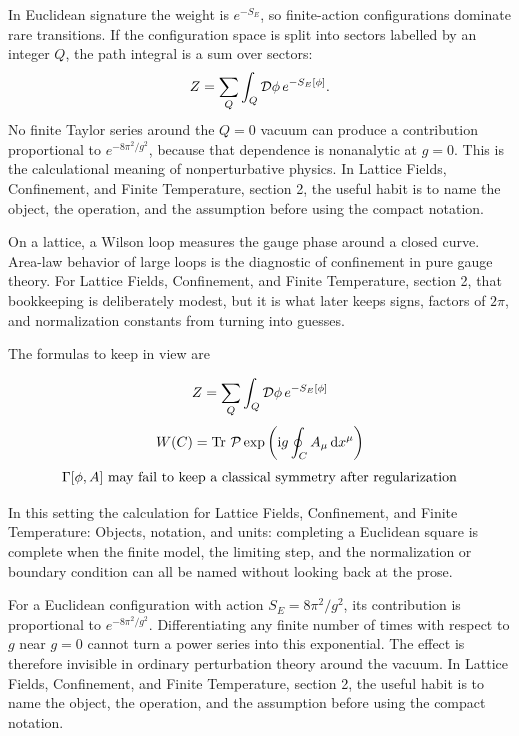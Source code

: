 In Euclidean signature the weight is \(e^{-S_E}\), so finite-action configurations dominate rare transitions.  If the configuration space is split into sectors labelled by an integer \(Q\), the path integral is a sum over sectors:
\[
  Z=\sum_Q\int_Q\mathcal D\phi\,e^{-S_E[\phi]}.
\]
No finite Taylor series around the \(Q=0\) vacuum can produce a contribution proportional to \(e^{-8\pi^2/g^2}\), because that dependence is nonanalytic at \(g=0\).  This is the calculational meaning of nonperturbative physics.  In Lattice Fields, Confinement, and Finite Temperature, section 2, the useful habit is to name the object, the operation, and the assumption before using the compact notation.

On a lattice, a Wilson loop measures the gauge phase around a closed curve.  Area-law behavior of large loops is the diagnostic of confinement in pure gauge theory.  For Lattice Fields, Confinement, and Finite Temperature, section 2, that bookkeeping is deliberately modest, but it is what later keeps signs, factors of \(2\pi\), and normalization constants from turning into guesses.

The formulas to keep in view are

\[
  Z=\sum_Q\int_Q\mathcal D\phi\,e^{-S_E[\phi]}
\]
\[
  W(C)=\operatorname{Tr}\,\mathcal P\exp\left(\mathrm i g\oint_C A_\mu\,\mathrm d x^\mu\right)
\]
\[
  \Gamma[\phi,A]\hbox{ may fail to keep a classical symmetry after regularization}
\]

In this setting the calculation for Lattice Fields, Confinement, and Finite Temperature: Objects, notation, and units: completing a Euclidean square is complete when the finite model, the limiting step, and the normalization or boundary condition can all be named without looking back at the prose.




\begin{example}
For a Euclidean configuration with action \(S_E=8\pi^2/g^2\), its contribution is proportional to \(e^{-8\pi^2/g^2}\).  Differentiating any finite number of times with respect to \(g\) near \(g=0\) cannot turn a power series into this exponential.  The effect is therefore invisible in ordinary perturbation theory around the vacuum.  In Lattice Fields, Confinement, and Finite Temperature, section 2, the useful habit is to name the object, the operation, and the assumption before using the compact notation.
\end{example}



